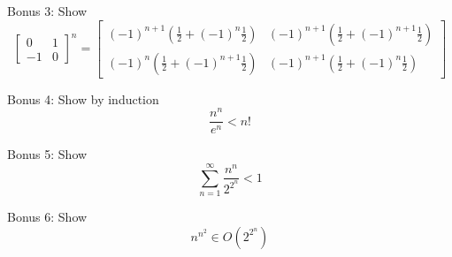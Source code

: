 \documentclass[16 pt]{amsart}
\theoremstyle{definition}
\theoremstyle{remark}
\numberwithin{equation}{subsection}
\begin{document}
Bonus 3: Show
\[
\begin{bmatrix}
0 & 1 \\ -1 & 0
\end{bmatrix}^n =
\begin{bmatrix}
(-1)^{n+1}(\frac{1}{2}+(-1)^{n}\frac{1}{2}) & (-1)^{n+1}(\frac{1}{2}+(-1)^{n+1}\frac{1}{2})\\
(-1)^{n}(\frac{1}{2}+(-1)^{n+1}\frac{1}{2})
 & (-1)^{n+1}(\frac{1}{2}+(-1)^{n}\frac{1}{2})
\end{bmatrix}
\]

\vspace{.75in}

Bonus 4: Show by induction
\[
\frac{n^n}{e^n} < n!
\]

\vspace{.75in}

Bonus 5: Show
\[
\sum_{n=1}^{\infty} \frac{n^n}{2^{2^n}} < 1
\]


\vspace{.75in}

Bonus 6: Show
\[
n^{n^2} \in O(2^{2^n})
\]
\end{document}
